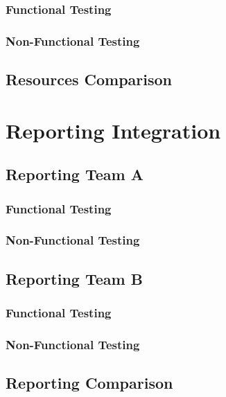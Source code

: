 \documentclass[12pt, oneside]{article}
\begin{document}
		\subsubsection{Functional Testing}
			
		\subsubsection{Non-Functional Testing }
			
			
	
	\subsection{Resources Comparison}
	
\newpage 
\section{Reporting Integration}
	\subsection{Reporting Team A}	
		\subsubsection{Functional Testing}
			
		\subsubsection{Non-Functional Testing }
			
	
	\subsection{Reporting Team B}	
		\subsubsection{Functional Testing}
			
		\subsubsection{Non-Functional Testing }
			
	
	\subsection{Reporting Comparison}
\end{document}
